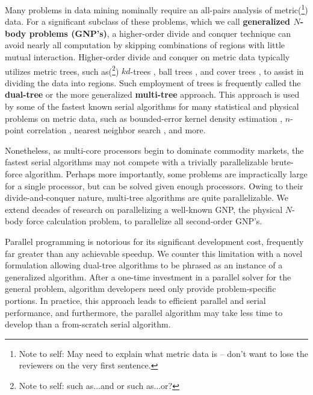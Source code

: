 \documentclass[twoside,leqno,twocolumn]{article}
\newcommand{\authornote}[1]{(\footnote{Note to self: #1})}
\newcommand{\authorsnote}[1]{\authornote{#1}}
\newcommand{\defterm}[1]{{\bf #1}}
\begin{document}
Many problems in data mining nominally require an all-pairs analysis of metric\authorsnote{May need to explain what metric data is -- don't want to lose the reviewers on the very first sentence.} data.
For a significant subclass of these problems, which we call \defterm{generalized $N$-body problems (GNP's)}, a higher-order divide and conquer technique can avoid nearly all computation by skipping combinations of regions with little mutual interaction.
Higher-order divide and conquer on metric data typically utilizes metric trees, such as\authorsnote{such as...and or such as...or?} $kd$-trees \cite{preparata_kdtrees}, ball trees \cite{anchors_balltrees_moore}, and cover trees \cite{covertrees}, to assist in dividing the data into regions.
Such employment of trees is frequently called the \defterm{dual-tree} or the more generalized \defterm{multi-tree} approach.
This approach is used by some of the fastest known serial algorithms for many statistical and physical problems on metric data, such as bounded-error kernel density estimation \cite{gray_kde, lee_gauss1, lee_gauss2}, $n$-point correlation \cite{gray_nbody}, nearest neighbor search \cite{gray_nbody}, and more.

Nonetheless, as multi-core processors begin to dominate commodity markets, the fastest serial algorithms may not compete with a trivially parallelizable brute-force algorithm.
Perhaps more importantly, some problems are impractically large for a single processor, but can be solved given enough processors.
Owing to their divide-and-conquer nature, multi-tree algorithms are quite parallelizable.
We extend decades of research on parallelizing a well-known GNP, the physical $N$-body force calculation problem, to parallelize all second-order GNP's.

Parallel programming is notorious for its significant development cost, frequently far greater than any achievable speedup.
We counter this limitation with a novel formulation allowing dual-tree algorithms to be phrased as an instance of a generalized algorithm.
After a one-time investment in a parallel solver for the general problem, algorithm developers need only provide problem-specific portions.
In practice, this approach leads to efficient parallel and serial performance, and furthermore, the parallel algorithm may take less time to develop than a from-scratch serial algorithm.

\end{document}
